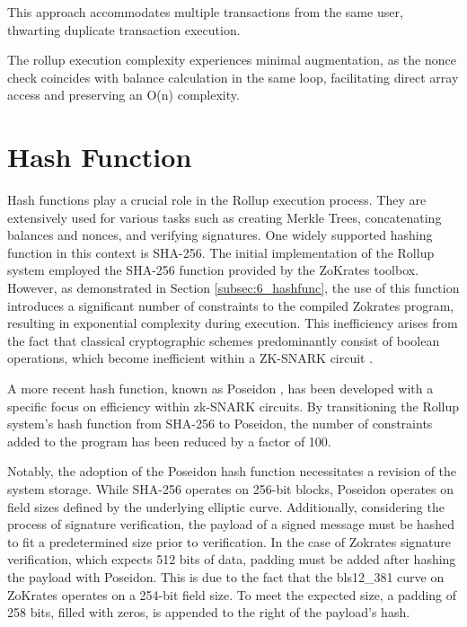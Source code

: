 This approach accommodates multiple transactions from the same user, thwarting duplicate transaction execution.

The rollup execution complexity experiences minimal augmentation, as the nonce check coincides with balance calculation in the same loop, facilitating direct array access and preserving an O(n) complexity.

\section{Hash Function}

Hash functions play a crucial role in the Rollup execution process. They are extensively used for various tasks such as creating Merkle Trees, concatenating balances and nonces, and verifying signatures. One widely supported hashing function in this context is SHA-256. The initial implementation of the Rollup system employed the SHA-256 function provided by the ZoKrates toolbox. However, as demonstrated in Section \ref{subsec:6_hashfunc}, the use of this function introduces a significant number of constraints to the compiled Zokrates program, resulting in exponential complexity during execution. This inefficiency arises from the fact that classical cryptographic schemes predominantly consist of boolean operations, which become inefficient within a ZK-SNARK circuit \cite{belles-munoz_twisted_2021}.

A more recent hash function, known as Poseidon \cite{grassi_poseidon_nodate}, has been developed with a specific focus on efficiency within zk-SNARK circuits. By transitioning the Rollup system's hash function from SHA-256 to Poseidon, the number of constraints added to the program has been reduced by a factor of 100.

Notably, the adoption of the Poseidon hash function necessitates a revision of the system storage. While SHA-256 operates on 256-bit blocks, Poseidon operates on field sizes defined by the underlying elliptic curve. Additionally, considering the process of signature verification, the payload of a signed message must be hashed to fit a predetermined size prior to verification. In the case of Zokrates signature verification, which expects 512 bits of data, padding must be added after hashing the payload with Poseidon. This is due to the fact that the bls12\_381 curve on ZoKrates operates on a 254-bit field size. To meet the expected size, a padding of 258 bits, filled with zeros, is appended to the right of the payload's hash.

